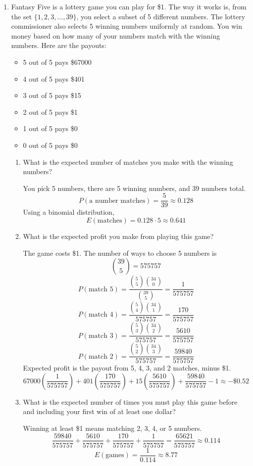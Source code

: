 \documentclass{article}
\begin{document}
\begin{enumerate}
    \item Fantasy Five is a lottery game you can play for \$1. The way it works is, from the set $\{1, 2, 3, \ldots, 39\}$, you select a subset of 5 different numbers.
    The lottery commissioner also selects 5 winning numbers uniformly at random.
    You win money based on how many of your numbers match with the winning numbers.
    Here are the payouts:
    \begin{itemize}
        \item 5 out of 5 pays \$67000
        \item 4 out of 5 pays \$401
        \item 3 out of 5 pays \$15
        \item 2 out of 5 pays \$1
        \item 1 out of 5 pays \$0
        \item 0 out of 5 pays \$0
    \end{itemize}
    \begin{enumerate}
        \item What is the expected number of matches you make with the winning numbers?

        You pick 5 numbers, there are 5 winning numbers, and 39 numbers total.
        \[
        P(\text{a number matches}) = \frac{5}{39} \approx 0.128
        \]
        Using a binomial distribution,
        \[
        E(\text{matches}) = 0.128 \cdot 5 \approx 0.641
        \]

        \item What is the expected profit you make from playing this game?

        The game costs \$1. The number of ways to choose 5 numbers is
        \[
        \binom{39}{5} = 575757
        \]
        \[
        P(\text{match 5}) = \frac{\binom{5}{5}\binom{34}{0}}{\binom{39}{5}} = \frac{1}{575757}
        \]
        \[
        P(\text{match 4}) = \frac{\binom{5}{4}\binom{34}{1}}{575757} = \frac{170}{575757}
        \]
        \[
        P(\text{match 3}) = \frac{\binom{5}{3}\binom{34}{2}}{575757} = \frac{5610}{575757}
        \]
        \[
        P(\text{match 2}) = \frac{\binom{5}{2}\binom{34}{3}}{575757} = \frac{59840}{575757}
        \]
        Expected profit is the payout from 5, 4, 3, and 2 matches, minus \$1.
        \[
        67000\left(\frac{1}{575757}\right) + 401\left(\frac{170}{575757}\right) + 15\left(\frac{5610}{575757}\right) + \frac{59840}{575757} - 1 \approx -\$0.52
        \]

        \item What is the expected number of times you must play this game before and including your first win of at least one dollar?

        Winning at least \$1 means matching 2, 3, 4, or 5 numbers.
        \[
        \frac{59840}{575757} + \frac{5610}{575757} + \frac{170}{575757} + \frac{1}{575757} = \frac{65621}{575757} \approx 0.114
        \]
        \[
        E(\text{games}) = \frac{1}{0.114} \approx 8.77
        \]
    \end{enumerate}

\end{enumerate}
\end{document}
